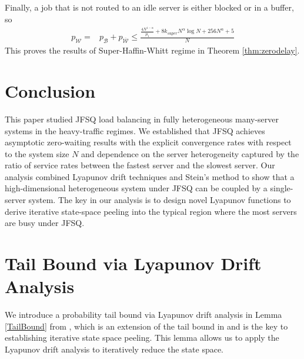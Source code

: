 \documentclass[11pt,oneside,letter]{article}
\begin{document}
Finally, a job that is not routed to an idle server is either blocked or in a buffer, so 
\begin{align*}
p_{\mathcal W} =&  p_{\mathcal B}+p_{\overline{\mathcal W}} \leq 
\frac{\frac{4N^{1-\alpha}}{\mu_1} + 8k_{super}N^\alpha\log N + 256N^\alpha + 5}{N} 
\end{align*}
This proves the results of Super-Haffin-Whitt regime in Theorem \ref{thm:zerodelay}. 


\section{Conclusion}
This paper studied JFSQ load balancing in fully heterogeneous many-server systems in the heavy-traffic regimes. We established that JFSQ achieves asymptotic zero-waiting results with the explicit convergence rates with respect to the system size $N$ and dependence on the server heterogeneity captured by the ratio of service rates between the fastest server and the slowest server. Our analysis combined Lyapunov drift techniques and Stein’s method to show that a high-dimensional heterogeneous system under JFSQ can be coupled by a single-server system. The key in our analysis is to design novel Lyapunov functions to derive iterative state-space peeling into the typical region where the most servers are busy under JFSQ. 

\newpage
\appendix
\section{Tail Bound via Lyapunov Drift Analysis}
We introduce a probability tail bound via Lyapunov drift analysis in Lemma \ref{TailBound} from \cite{WanMagSri_21}, which is an extension of the tail bound in \cite{BerGamTsi_01} and is the key to establishing iterative state space peeling. This lemma allows us to apply the Lyapunov drift analysis to iteratively reduce the state space. 
\end{document}
